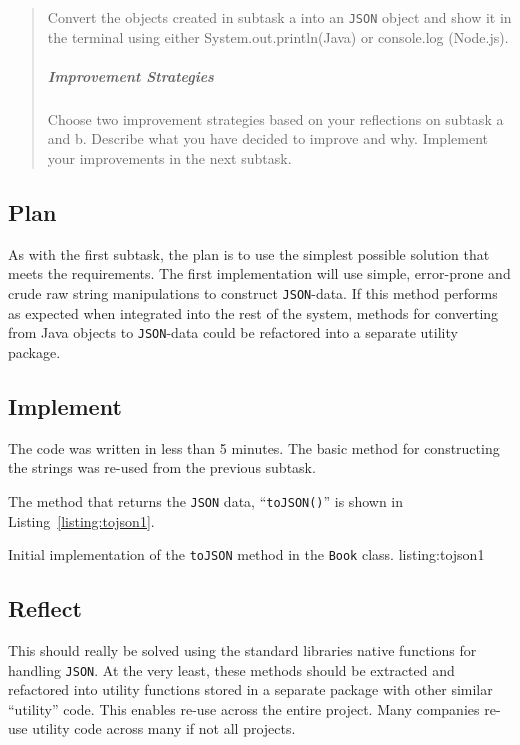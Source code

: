 \begin{quote}
  Convert the objects created in subtask a into an \texttt{JSON} object and show it in
  the terminal using either System.out.println(Java) or console.log (Node.js).

  \subparagraph{Improvement Strategies}

  Choose two improvement strategies based on your reflections on subtask a and
  b. Describe what you have decided to improve and why. Implement your
  improvements in the next subtask.
\end{quote}


\subsection{Plan}\label{task-1b-plan}
As with the first subtask, the plan is to use the simplest possible solution
that meets the requirements.
The first implementation will use simple, error-prone and crude raw string
manipulations to construct \texttt{JSON}-data.
If this method performs as expected when integrated into the rest of the system,
methods for converting from Java objects to \texttt{JSON}-data could be refactored into
a separate utility package.


\subsection{Implement}\label{task-1b-implement}
The code was written in less than 5 minutes. The basic method for
constructing the strings was re-used from the previous subtask.

The method that returns the \texttt{JSON} data, ``\texttt{toJSON()}'' is shown
in Listing~\ref{listing:tojson1}.

           {Initial implementation of the \texttt{toJSON\(\)} method in the
            \texttt{Book} class.}
           {listing:tojson1}


\subsection{Reflect}\label{task-1b-reflect}
This should really be solved using the standard libraries native functions for
handling \texttt{JSON}.
At the very least, these methods should be extracted and refactored into
utility functions stored in a separate package with other similar ``utility''
code.  This enables re-use across the entire project. Many companies re-use
utility code across many if not all projects.


